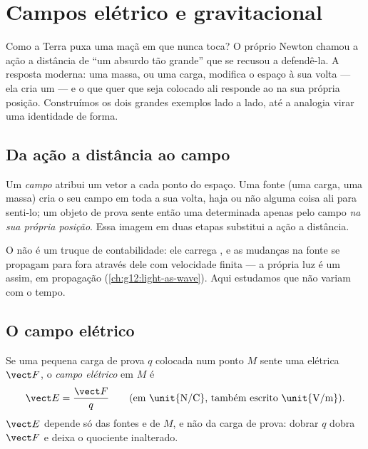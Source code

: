 \chapter{Campos elétrico e gravitacional}\label{ch:g11:electric-gravitational-fields}

Como a Terra puxa uma maçã em que nunca toca? O próprio Newton chamou a
ação a distância de ``um absurdo tão grande'' que se recusou a defendê-la.
A resposta moderna: uma massa, ou uma carga, modifica o espaço à sua
volta --- ela cria um \emph{} --- e o que quer que seja colocado ali
responde ao  na sua própria posição. Construímos os dois grandes
exemplos lado a lado, até a analogia virar uma identidade de forma.

\section{Da ação a distância ao campo}

\begin{definition}[Campo]\label{def:g11:electric-gravitational-fields:field}
Um \emph{campo} atribui um vetor a cada ponto do espaço. Uma
fonte (uma carga, uma massa) cria o seu campo em toda a sua volta, haja
ou não alguma coisa ali para senti-lo; um objeto de prova sente então uma
 determinada apenas pelo campo \emph{na sua própria posição}. Essa
imagem em duas etapas substitui a ação a distância.
\end{definition}

\begin{remark}
O  não é um truque de contabilidade: ele carrega , e as
mudanças na fonte se propagam para fora através dele com velocidade
finita --- a própria luz é um  assim, em propagação
(\cref{ch:g12:light-as-wave}). Aqui estudamos  que não variam com
o tempo.
\end{remark}

\section{O campo elétrico}

\begin{definition}\label{def:g11:electric-gravitational-fields:efield}
Se uma pequena carga de prova $q$ colocada num ponto $M$ sente uma 
elétrica $\vect F$, o \emph{campo elétrico} em $M$ é
\[
\vect E = \frac{\vect F}{q}
\qquad \text{(em \unit{N/C}, também escrito \unit{V/m})}.
\]
$\vect E$ depende só das fontes e de $M$, e não da carga de prova: dobrar
$q$ dobra $\vect F$ e deixa o quociente inalterado.
\end{definition}

